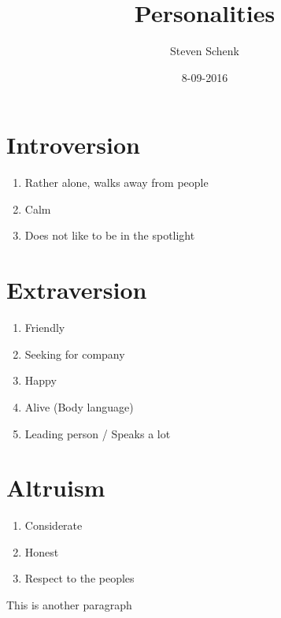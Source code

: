 \documentclass{article}
\title{Personalities}
\date{8-09-2016}
\author{Steven Schenk}
\begin{document}
  \maketitle
  \newpage
  \tableofcontents

  \newpage
  \section{Introversion}

\begin{enumerate}
	\item Rather alone, walks away from people 
	\item Calm 
	\item Does not like to be in the spotlight
\end{enumerate} 

\section{Extraversion}

\begin{enumerate}
	\item Friendly 
	\item Seeking for company
	\item Happy
	\item Alive (Body language)
	\item Leading person / Speaks a lot
\end{enumerate} 

\section{Altruism}

\begin{enumerate}
	\item Considerate 
	\item Honest
	\item Respect to the peoples
\end{enumerate} 


  This is another paragraph
\end{document}
